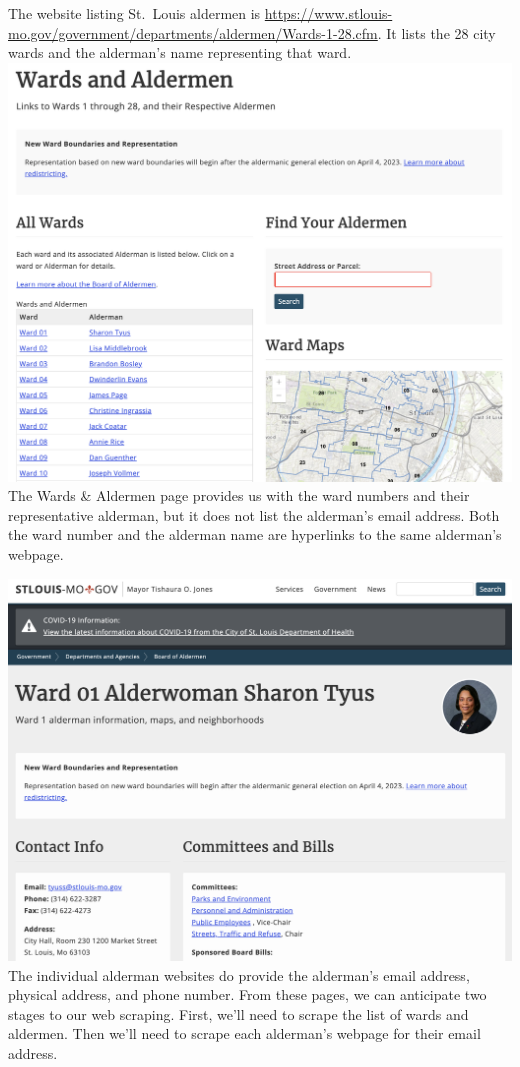 \documentclass[
  krantz2]{krantz}
\begin{document}
The website listing St.~Louis aldermen is \url{https://www.stlouis-mo.gov/government/departments/aldermen/Wards-1-28.cfm}. It lists the 28 city wards and the alderman's name representing that ward.
\includegraphics{images/wards-aldermen-website.png}
The Wards \& Aldermen page provides us with the ward numbers and their representative alderman, but it does not list the alderman's email address. Both the ward number and the alderman name are hyperlinks to the same alderman's webpage.

\includegraphics{images/sharon-tyus.png}
The individual alderman websites do provide the alderman's email address, physical address, and phone number. From these pages, we can anticipate two stages to our web scraping. First, we'll need to scrape the list of wards and aldermen. Then we'll need to scrape each alderman's webpage for their email address.
\end{document}
